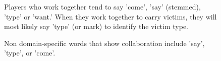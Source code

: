     
\begin{figure}[h!]
    \centering
    \caption{Players who work together tend to say  'come', 'say' (stemmed), 'type' or 'want.' When they work together to carry victims, they will most likely say 'type' (or mark) to identify the victim type.}
    \end{figure}

\begin{figure}[h!]
    \centering
    \caption{Non domain-specific words that show collaboration include 'say', 'type',
        or 'come'. }
\end{figure}

